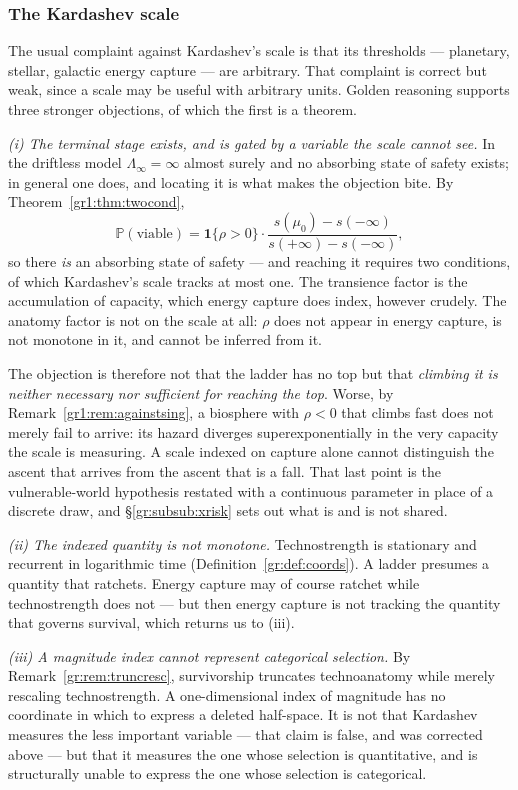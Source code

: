 \documentclass[11pt]{article}
\numberwithin{equation}{section}
\theoremstyle{plain}
\theoremstyle{definition}
\theoremstyle{remark}
\newcommand{\PP}{\mathbb{P}}
\newcommand{\one}{\mathbf{1}}
\begin{document}
\subsubsection{The Kardashev scale}\label{gr:subsub:kardashev}

The usual complaint against Kardashev's scale \cite{Kar64} is that its
thresholds --- planetary, stellar, galactic energy capture --- are
arbitrary. That complaint is correct but weak, since a scale may be
useful with arbitrary units. Golden reasoning supports three stronger
objections, of which the first is a theorem.

\emph{(i) The terminal stage exists, and is gated by a variable the
scale cannot see.} In the driftless model $\Lambda_\infty=\infty$
almost surely and no absorbing state of safety exists; in general one
does, and locating it is what makes the objection bite. By
Theorem~\ref{gr1:thm:twocond},
\[
\PP(\text{viable})=\one\{\rho>0\}\cdot
\frac{s(\mu_0)-s(-\infty)}{s(+\infty)-s(-\infty)},
\]
so there \emph{is} an absorbing state of safety --- and reaching it
requires two conditions, of which Kardashev's scale tracks at most one.
The transience factor is the accumulation of capacity, which energy
capture does index, however crudely. The anatomy factor is not on the
scale at all: $\rho$ does not appear in energy capture, is not
monotone in it, and cannot be inferred from it.

The objection is therefore not that the ladder has no top but that
\emph{climbing it is neither necessary nor sufficient for reaching the
top}. Worse, by Remark~\ref{gr1:rem:againstsing}, a biosphere with
$\rho<0$ that climbs fast does not merely fail to arrive: its hazard
diverges superexponentially in the very capacity the scale is
measuring. A scale indexed on capture alone cannot distinguish the
ascent that arrives from the ascent that is a fall. That last point is
the vulnerable-world hypothesis \cite{Bostrom19} restated with a
continuous parameter in place of a discrete draw, and
\S\ref{gr:subsub:xrisk} sets out what is and is not shared.

\emph{(ii) The indexed quantity is not monotone.} Technostrength is
stationary and recurrent in logarithmic time
(Definition~\ref{gr:def:coords}). A ladder presumes a quantity that
ratchets. Energy capture may of course ratchet while technostrength does
not --- but then energy capture is not tracking the quantity that
governs survival, which returns us to (iii).

\emph{(iii) A magnitude index cannot represent categorical selection.}
By Remark~\ref{gr:rem:truncresc}, survivorship truncates technoanatomy
while merely rescaling technostrength. A one-dimensional index of
magnitude has no coordinate in which to express a deleted half-space. It
is not that Kardashev measures the less important variable --- that
claim is false, and was corrected above --- but that it measures the one
whose selection is quantitative, and is structurally unable to express
the one whose selection is categorical.
\end{document}
